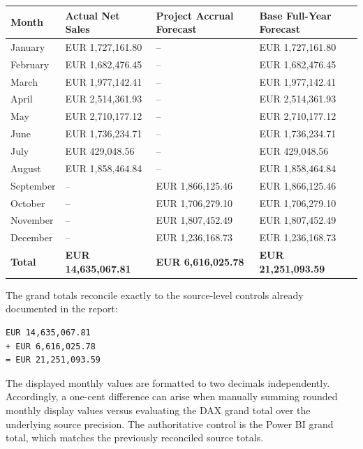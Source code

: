 \documentclass[11pt,a4paper]{article}
\begin{document}
\begin{tabularx}{\textwidth}{
    >{\raggedright\arraybackslash}p{2.6cm}
    >{\raggedleft\arraybackslash}p{3.4cm}
    >{\raggedleft\arraybackslash}p{3.4cm}
    >{\raggedleft\arraybackslash}X
}

\toprule

Month
&
Actual Net Sales
&
Project Accrual Forecast
&
Base Full-Year Forecast
\\

\midrule

January   & EUR 1,727,161.80 & -- & EUR 1,727,161.80 \\
February  & EUR 1,682,476.45 & -- & EUR 1,682,476.45 \\
March     & EUR 1,977,142.41 & -- & EUR 1,977,142.41 \\
April     & EUR 2,514,361.93 & -- & EUR 2,514,361.93 \\
May       & EUR 2,710,177.12 & -- & EUR 2,710,177.12 \\
June      & EUR 1,736,234.71 & -- & EUR 1,736,234.71 \\
July      & EUR 429,048.56   & -- & EUR 429,048.56 \\
August    & EUR 1,858,464.84 & -- & EUR 1,858,464.84 \\
September & -- & EUR 1,866,125.46 & EUR 1,866,125.46 \\
October   & -- & EUR 1,706,279.10 & EUR 1,706,279.10 \\
November  & -- & EUR 1,807,452.49 & EUR 1,807,452.49 \\
December  & -- & EUR 1,236,168.73 & EUR 1,236,168.73 \\

\midrule

\textbf{Total}
&
\textbf{EUR 14,635,067.81}
&
\textbf{EUR 6,616,025.78}
&
\textbf{EUR 21,251,093.59}
\\

\bottomrule

\end{tabularx}

The grand totals reconcile exactly to the source-level controls already
documented in the report:

\begin{lstlisting}[style=powerquery]
EUR 14,635,067.81
+ EUR 6,616,025.78
= EUR 21,251,093.59
\end{lstlisting}

The displayed monthly values are formatted to two decimals independently.
Accordingly, a one-cent difference can arise when manually summing rounded
monthly display values versus evaluating the DAX grand total over the underlying
source precision. The authoritative control is the Power BI grand total, which
matches the previously reconciled source totals.
\end{document}
